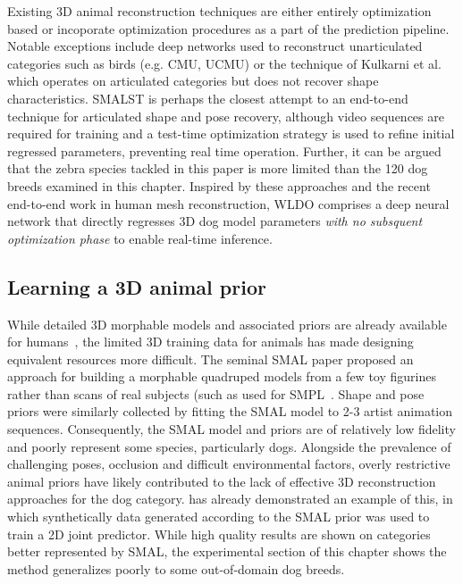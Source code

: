 Existing 3D animal reconstruction techniques are either entirely optimization based or incoporate optimization procedures as a part of the prediction pipeline. Notable exceptions include deep networks used to reconstruct unarticulated categories such as birds (e.g. CMU, UCMU) or the technique of Kulkarni et al.~ which operates on articulated categories but does not recover shape characteristics. SMALST is perhaps the closest attempt to an end-to-end technique for articulated shape and pose recovery, although video sequences are required for training and a test-time optimization strategy is used to refine initial regressed parameters, preventing real time operation. Further, it can be argued that the zebra species tackled in this paper is more limited than the 120 dog breeds examined in this chapter. Inspired by these approaches and the recent end-to-end work in human mesh reconstruction, WLDO comprises a deep neural network that directly regresses 3D dog model parameters \emph{with no subsquent optimization phase} to enable real-time inference.



\subsection{Learning a 3D animal prior}
 
While detailed 3D morphable models and associated priors are already available for humans~, the limited 3D training data for animals has made designing equivalent resources more difficult. The seminal SMAL paper proposed an approach for building a morphable quadruped models from a few toy figurines rather than scans of real subjects (such as used for SMPL~. Shape and pose priors were similarly collected by fitting the SMAL model to 2-3 artist animation sequences. Consequently, the SMAL model and priors are of relatively low fidelity and poorly represent some species, particularly dogs. Alongside the prevalence of challenging poses, occlusion and difficult environmental factors, overly restrictive animal priors have likely contributed to the lack of effective 3D reconstruction approaches for the dog category.  has already demonstrated an example of this, in which synthetically data generated according to the SMAL prior was used to train a 2D joint predictor. While high quality results are shown on categories better represented by SMAL, the experimental section of this chapter shows the method generalizes poorly to some out-of-domain dog breeds. 


